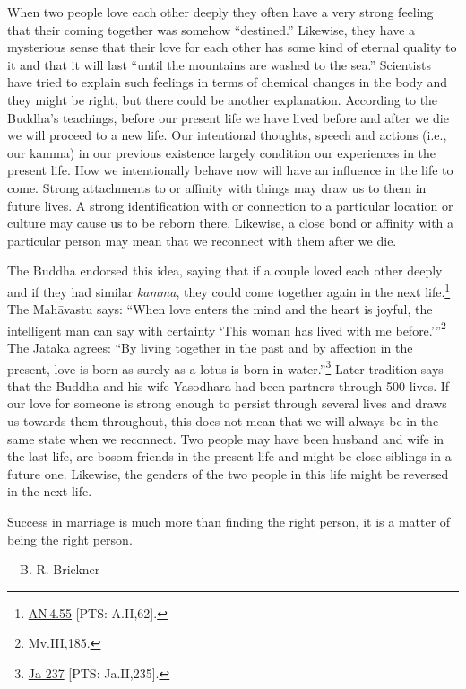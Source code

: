 \documentclass[10pt, openright]{book}
\newenvironment{epigram-2}%
{%
\setstretch{1.4}
\vspace{1em}
\noindent
\quoting[leftmargin=2cm,rightmargin=2cm]%
\begin{itshape}
\large
}%
{\end{itshape}\endquoting
}%
\newenvironment{epigram-2-cite}%
{%
\quoting[leftmargin=2cm,rightmargin=2cm]%
\noindent\normal\hspace*{\fill} 
}%
{\endquoting
}%
\begin{document}
When two people love each other deeply they often have a very strong feeling that their coming together was somehow “destined.” Likewise, they have a mysterious sense that their love for each other has some kind of eternal quality to it and that it will last “until the mountains are washed to the sea.” Scientists have tried to explain such feelings in terms of chemical changes in the body and they might be right, but there could be another explanation. According to the Buddha’s teachings, before our present life we have lived before and after we die we will proceed to a new life. Our intentional thoughts, speech and actions (i.e., our kamma) in our previous existence largely condition our experiences in the present life. How we intentionally behave now will have an influence in the life to come. Strong attachments to or affinity with things may draw us to them in future lives. A strong identification with or connection to a particular location or culture may cause us to be reborn there. Likewise, a close bond or affinity with a particular person may mean that we reconnect with them after we die.


The Buddha endorsed this idea, saying that if a couple loved each other deeply and if they had similar \textit{kamma}, they could come together again in the next life.\footnote {\href{https://suttacentral.net/an4.55/en/sujato}{AN 4.55} [PTS: A.II,62].} The Mahāvastu says: “When love enters the mind and the heart is joyful, the intelligent man can say with certainty ‘This woman has lived with me before.’”\footnote {Mv.III,185.} The Jātaka agrees: “By living together in the past and by affection in the present, love is born as surely as a lotus is born in water.”\footnote {\href{https://suttacentral.net/ja237/en/rouse}{Ja 237} [PTS: Ja.II,235].} Later tradition says that the Buddha and his wife Yasodhara had been partners through 500 lives. If our love for someone is strong enough to persist through several lives and draws us towards them throughout, this does not mean that we will always be in the same state when we reconnect. Two people may have been husband and wife in the last life, are bosom friends in the present life and might be close siblings in a future one. Likewise, the genders of the two people in this life might be reversed in the next life.


\begin{epigram-2}
Success in marriage is much more than finding the right person, it is a matter of being the right person.
\end{epigram-2}
\begin{epigram-2-cite}
—B. R. Brickner
\end{epigram-2-cite}
\end{document}
